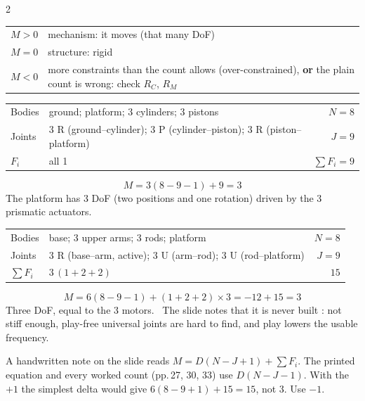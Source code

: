 \begin{multicols}{2}
\begin{recipe}
\end{recipe}
\begin{fbx}
\begin{tabularx}{\linewidth}{@{}lX@{}}\toprule
$M>0$ & mechanism: it moves (that many DoF)\\
$M=0$ & structure: rigid\\
$M<0$ & more constraints than the count allows (over-constrained), \textbf{or} the plain count is wrong: check $R_C$, $R_M$\\\bottomrule
\end{tabularx}
\end{fbx}

\begin{worked}[3-PRR, planar, $D=3$ \pg{27}; W13 Q6 \pg{12}]
\begin{tabularx}{\linewidth}{@{}lXr@{}}\toprule
Bodies & ground; platform; 3 cylinders; 3 pistons & $N=8$\\
Joints & 3 R (ground--cylinder); 3 P (cylinder--piston); 3 R (piston--platform) & $J=9$\\
$F_i$ & all 1 & $\sum F_i=9$\\\bottomrule
\end{tabularx}
\[M=3(8-9-1)+9=3\]
The platform has 3 DoF (two positions and one rotation) driven by the 3 prismatic actuators. \chk
\end{worked}

\begin{worked}[simplest delta, $D=6$ \pg{30}]
\begin{tabularx}{\linewidth}{@{}lXr@{}}\toprule
Bodies & base; 3 upper arms; 3 rods; platform & $N=8$\\
Joints & 3 R (base--arm, active); 3 U (arm--rod); 3 U (rod--platform) & $J=9$\\
$\sum F_i$ & $3\,(1+2+2)$ & $15$\\\bottomrule
\end{tabularx}
\[M=6(8-9-1)+(1+2+2)\times3=-12+15=3\]
Three DoF, equal to the 3 motors. \chk\ The slide notes that it is never built : not stiff enough, play-free universal joints are hard to find, and play lowers the usable frequency.
\end{worked}
\begin{slideerr}[slide 29]
A handwritten note on the slide reads $M=D(N-J+1)+\sum F_i$. The printed equation  and every worked count (pp.\,27, 30, 33) use $D(N-J-1)$. With the $+1$ the simplest delta would give $6(8-9+1)+15=15$, not 3. Use $-1$. \chk
\end{slideerr}


\end{multicols}
